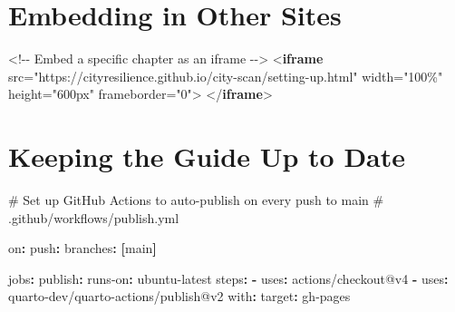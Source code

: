 \documentclass[
  letterpaper,
  DIV=11,
  numbers=noendperiod]{scrreprt}
\newenvironment{Shaded}{\begin{snugshade}}{\end{snugshade}}
\newcommand{\AttributeTok}[1]{\textcolor[rgb]{0.40,0.45,0.13}{#1}}
\newcommand{\CommentTok}[1]{\textcolor[rgb]{0.37,0.37,0.37}{#1}}
\newcommand{\DataTypeTok}[1]{\textcolor[rgb]{0.68,0.00,0.00}{#1}}
\newcommand{\FunctionTok}[1]{\textcolor[rgb]{0.28,0.35,0.67}{#1}}
\newcommand{\KeywordTok}[1]{\textcolor[rgb]{0.00,0.23,0.31}{\textbf{#1}}}
\newcommand{\OperatorTok}[1]{\textcolor[rgb]{0.37,0.37,0.37}{#1}}
\newcommand{\OtherTok}[1]{\textcolor[rgb]{0.00,0.23,0.31}{#1}}
\newcommand{\StringTok}[1]{\textcolor[rgb]{0.13,0.47,0.30}{#1}}
\begin{document}
\section{Embedding in Other Sites}\label{embedding-in-other-sites}

\begin{Shaded}
\begin{Highlighting}[]
\CommentTok{\textless{}!{-}{-} Embed a specific chapter as an iframe {-}{-}\textgreater{}}
\DataTypeTok{\textless{}}\KeywordTok{iframe}
\OtherTok{  src}\OperatorTok{=}\StringTok{"https://cityresilience.github.io/city{-}scan/setting{-}up.html"}
\OtherTok{  width}\OperatorTok{=}\StringTok{"100\%"}
\OtherTok{  height}\OperatorTok{=}\StringTok{"600px"}
\OtherTok{  frameborder}\OperatorTok{=}\StringTok{"0"}\DataTypeTok{\textgreater{}}
\DataTypeTok{\textless{}/}\KeywordTok{iframe}\DataTypeTok{\textgreater{}}
\end{Highlighting}
\end{Shaded}

\section{Keeping the Guide Up to
Date}\label{keeping-the-guide-up-to-date}

\begin{Shaded}
\begin{Highlighting}[]
\CommentTok{\# Set up GitHub Actions to auto{-}publish on every push to main}
\CommentTok{\# .github/workflows/publish.yml}
\end{Highlighting}
\end{Shaded}

\begin{Shaded}
\begin{Highlighting}[]
\FunctionTok{on}\KeywordTok{:}
\AttributeTok{  }\FunctionTok{push}\KeywordTok{:}
\AttributeTok{    }\FunctionTok{branches}\KeywordTok{:}\AttributeTok{ }\KeywordTok{[}\AttributeTok{main}\KeywordTok{]}

\FunctionTok{jobs}\KeywordTok{:}
\AttributeTok{  }\FunctionTok{publish}\KeywordTok{:}
\AttributeTok{    }\FunctionTok{runs{-}on}\KeywordTok{:}\AttributeTok{ ubuntu{-}latest}
\AttributeTok{    }\FunctionTok{steps}\KeywordTok{:}
\AttributeTok{      }\KeywordTok{{-}}\AttributeTok{ }\FunctionTok{uses}\KeywordTok{:}\AttributeTok{ actions/checkout@v4}
\AttributeTok{      }\KeywordTok{{-}}\AttributeTok{ }\FunctionTok{uses}\KeywordTok{:}\AttributeTok{ quarto{-}dev/quarto{-}actions/publish@v2}
\AttributeTok{        }\FunctionTok{with}\KeywordTok{:}
\AttributeTok{          }\FunctionTok{target}\KeywordTok{:}\AttributeTok{ gh{-}pages}
\end{Highlighting}
\end{Shaded}
\end{document}
